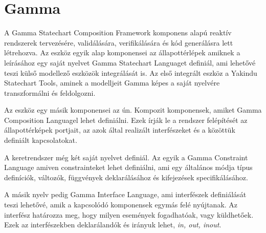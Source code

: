 \section{Gamma}

A Gamma Statechart Composition Framework komponens alapú reaktív rendszerek tervezésére, validálására, verifikálására és kód generálásra lett létrehozva. Az eszköz egyik alap komponensei az állapottérlépek amiknek a leírásához egy saját nyelvet Gamma Statechart Languaget definiál, ami lehetővé teszi külső modellező eszközök integrálását is. Az első integrált eszköz a Yakindu Statechart Tools, aminek a modelljeit Gamma képes a saját nyelvére transzformálni és feldolgozni.

Az eszköz egy másik komponensei az ún. Kompozit komponensek, amiket Gamma Composition Languagel lehet definiálni. Ezek írják le a rendszer felépítését az állapottérképek portjait, az azok által realizált interfészeket és a közöttük definiált kapcsolatokat.

A keretrendszer még két saját nyelvet definiál. Az egyik a Gamma Constraint Language amiven constrainteket lehet definiálni, ami egy általános módja típus definíciók, változók, függvények deklarálásához és kifejezések specifikálásához.

A másik nyelv pedig Gamma Interface Language, ami interfészek definiálását teszi lehetővé, amik a kapcsolódó komponensek egymás felé nyújtanak. Az interfész határozza meg, hogy milyen események fogadhatóak, vagy küldhetőek. Ezek az interfészekben deklarálandók és irányuk lehet, \emph{in, out, inout}.


